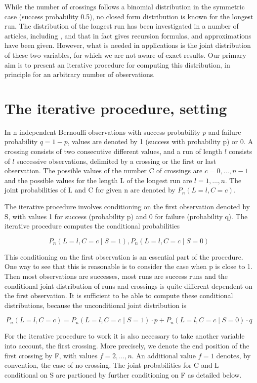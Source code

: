While the number of crossings follows a binomial distribution in the symmetric case (success probability 0.5), no closed form distribution is known for the longest run. The distribution of the longest run has been investigated in a number of articles, including \citep{Schilling:2012}, and \citep{Fazekas:2010} that in fact gives recursion formulas, and approximations have been given. However, what is needed in applications is the joint distribution of these two variables, for which we are not aware of exact results. Our primary aim is to present an iterative procedure for computing this distribution, in principle for an arbitrary number of observations.

\section{The iterative procedure, setting}

In n independent Bernoulli observations with success probability $p$ and failure probability $q = 1 - p$, values are denoted by 1 (success with probability p) or 0. A crossing consists of two consecutive different values, and a run of length $l$ consists of $l$ successive observations, delimited by a crossing or the first or last observation. The possible values of the number C of crossings are $c=0, \ldots ,n-1$ and the possible values for the length L of the longest run are $l=1, \ldots ,n$. The joint probabilities of L and C for given n are denoted by $P_n (L=l,C=c)$.

The iterative procedure involves conditioning on the first observation denoted by S, with values 1 for success (probability p) and 0 for failure (probability q). The iterative procedure computes the conditional probabilities 

$$P_n (L=l,C=c \mid S=1), P_n (L=l,C=c \mid S=0)$$

This conditioning on the first observation is an essential part of the procedure. One way to see that this is reasonable is to consider the case when p is close to 1. Then most observations are successes, most runs are success runs and the conditional joint distribution of runs and crossings is quite different dependent on the first observation. It is sufficient to be able to compute these conditional distributions, because the unconditional joint distribution is

$$P_n (L=l,C=c) = P_n (L=l,C=c \mid S=1) \cdot p + P_n (L=l,C=c \mid S=0) \cdot q$$

For the iterative procedure to work it is also necessary to take another variable into account, the first crossing. More precisely, we denote the end position of the first crossing by F, with values $f=2, \ldots ,n$. An additional value $f=1$ denotes, by convention, the case of no crossing. The joint probabilities for C and L conditional on S are partioned by further conditioning on F as detailed below.

